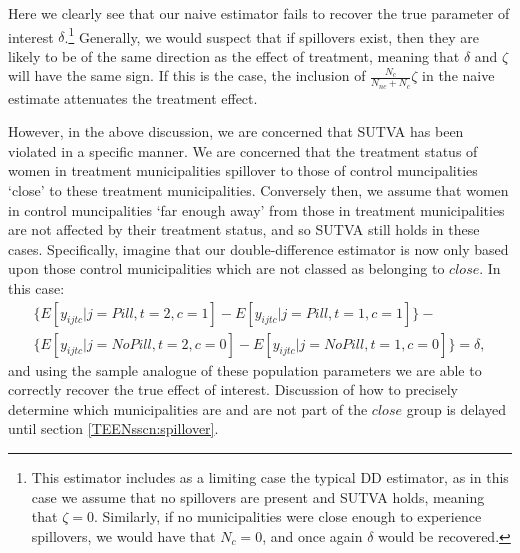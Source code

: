 Here we clearly see that our naive estimator fails to recover the true parameter
of interest $\delta$.\footnote{This estimator includes as a limiting case the
typical DD estimator, as in this case we assume that no spillovers are 
present and SUTVA holds, meaning that $\zeta=0$.  Similarly, if no municipalities 
were close enough to experience spillovers, we would have that $N_c=0$, and once 
again $\delta$ would be recovered.}  Generally, we would suspect that if 
spillovers exist, then they are likely to be of the same direction as the effect 
of treatment, meaning that $\delta$ and $\zeta$ will have the same sign.  If this 
is the case, the inclusion of $\frac{N_c}{N_{nc}+N_c}\zeta$ in the naive estimate 
attenuates the treatment effect.

However, in the above discussion, we are concerned that SUTVA has been violated 
in a specific manner.  We are concerned that the treatment status of women in 
treatment municipalities spillover to those of control muncipalities `close' to 
these treatment municipalities.  Conversely then, we assume that women in 
control muncipalities `far enough away' from those in treatment municipalities 
are not affected by their treatment status, and so SUTVA still holds in these 
cases.  Specifically, imagine that our double-difference estimator is now only 
based upon those control municipalities which are not classed as belonging to 
$close$.  In this case:
\begin{equation}
 \label{TEENeqn:DDaextend}
\begin{split}
 \{E[y_{ijtc}|j=Pill,t=2,c=1]- E[y_{ijtc}|j=Pill,t=1,c=1]\}-\\
 \{E[y_{ijtc}|j=No Pill,t=2,c=0]- E[y_{ijtc}|j=No Pill,t=1,c=0]\} = \delta,
 \end{split}
\end{equation}
and using the sample analogue of these population parameters we are able to
correctly recover the true effect of interest.  Discussion of how to precisely
determine which municipalities are and are not part of the $close$ group is 
delayed until section \ref{TEENsscn:spillover}.

